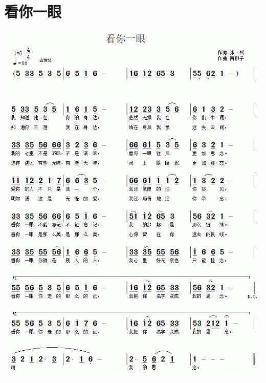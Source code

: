 \documentclass[cn,pad,twocol]{elegantbook}
\begin{document}
\section{看你一眼} \includegraphics[width=\textwidth]{rpi400/20210206看你一眼.png}
\end{document}
